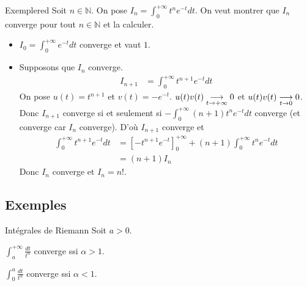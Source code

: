     \begin{omed}{Exemple}{red}
        Soit $n \in \mathbb{N}$. On pose $I_n = \int_{0}^{+\infty} t^n e^{-t} dt$. On veut montrer que $I_n$ converge pour tout $n \in \mathbb{N}$ et la calculer.
        \begin{itemize}
            \item $I_0= \int_{0}^{+\infty} e^{-t}dt$ converge et vaut $1$.
            \item Supposons que $I_n$ converge. 
            \begin{align*}
                I_{n+1} 
                &= \int_{0}^{+\infty} t^{n+1} e^{-t} dt
            \end{align*}
            On pose $u(t) = t^{n+1}$ et $v(t) = - e^{-t}$. $u(t)v(t) \underset{t \rightarrow +\infty}{\longrightarrow} 0$ et $u(t)v(t) \underset{t \rightarrow 0}{\longrightarrow} 0$. Donc $I_{n+1}$ converge si et seulement si $- \int_{0}^{+\infty} (n+1)t^{n} e^{-t}dt$ converge (et converge car $I_n$ converge). D’où $I_{n+1}$ converge et 
            \begin{align*}
                \int_{0}^{+\infty} t^{n+1}e^{-t}dt 
                &= \left[-t^{n+1}e^{-t}\right]_0^{+\infty} + (n+1) \int_{0}^{+\infty} t^n e^{-t}dt \\
                &= (n+1)I_n
            \end{align*} 
            Donc $I_n$ converge et $I_n = n!$.
        \end{itemize}
    \end{omed}

\subsection{Exemples}

    \begin{prop}{Intégrales de Riemann}{}
        Soit $a > 0$.

        \begin{alors}
            \item $\int_{a}^{+\infty} \frac{dt}{t^{\alpha}}$ converge ssi $\alpha > 1$.
            \item $\int_{0}^{a} \frac{dt}{t^{\alpha}}$ converge ssi $\alpha < 1$.
        \end{alors}
    \end{prop}

